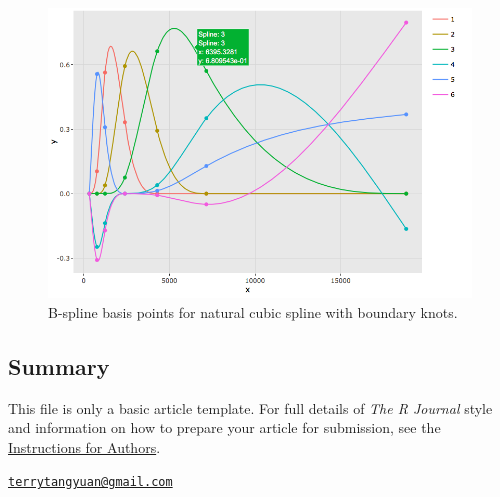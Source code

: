 \begin{figure}[htbp]
  \centering
  \includegraphics[width=145mm,scale=0.8]{images/splines_caption.png}
  \caption{B-spline basis points for natural cubic spline with boundary knots.}
  \label{figure:splines_caption}
\end{figure}

\subsection{Summary}\label{summary}

This file is only a basic article template. For full details of
\emph{The R Journal} style and information on how to prepare your
article for submission, see the
\href{https://journal.r-project.org/share/author-guide.pdf}{Instructions
for Authors}. 

\address{%
Yuan Tang\\
H2O.ai\\
2309 Wake Robin Drive\\ West Lafayette, IN 47906\\
}
\href{mailto:terrytangyuan@gmail.com}{\nolinkurl{terrytangyuan@gmail.com}}

